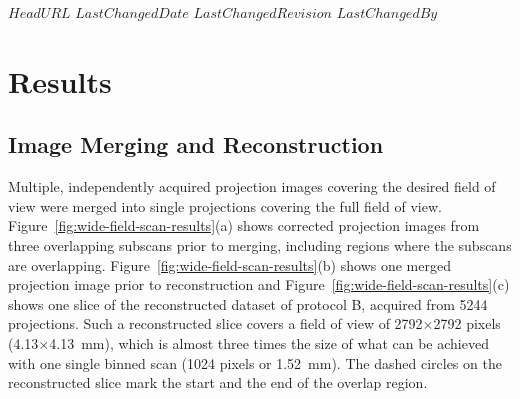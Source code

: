 \svnidlong
{$HeadURL$}
{$LastChangedDate$}
{$LastChangedRevision$}
{$LastChangedBy$}

\section{Results}\label{sec:Results}
\subsection{Image Merging and Reconstruction}\label{sec:Image Merging and Reconstruction}
Multiple, independently acquired projection images covering the desired field of view were merged into single projections covering the full field of view. Figure~\ref{fig:wide-field-scan-results}(a) shows corrected projection images from three overlapping subscans prior to merging, including regions where the subscans are overlapping. Figure~\ref{fig:wide-field-scan-results}(b) shows one merged projection image prior to reconstruction and Figure~\ref{fig:wide-field-scan-results}(c) shows one slice of the reconstructed dataset of protocol B, acquired from 5244 projections. Such a reconstructed slice covers a field of view of 2792$\times$2792 pixels (4.13$\times$\SI{4.13}{\milli\meter}), which is almost three times the size of what can be achieved with one single binned scan (1024 pixels or \SI{1.52}{\milli\meter}). %
The dashed circles on the reconstructed slice mark the start and the end of the overlap region.


